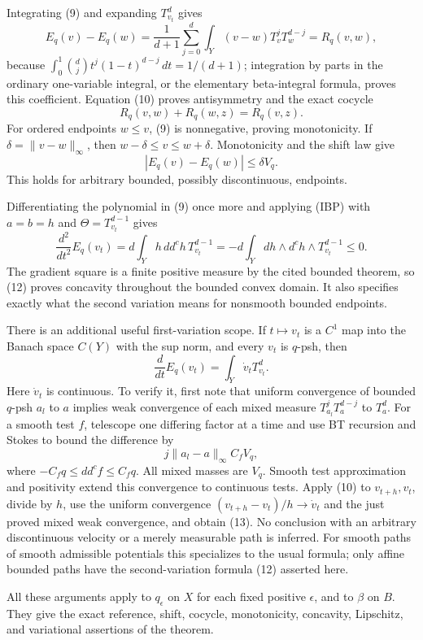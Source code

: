 \documentclass[
  11pt,
]{article}
\begin{document}
Integrating (9) and expanding \(T_{v_t}^d\) gives \[E_q(v)-E_q(w)
=\frac1{d+1}\sum_{j=0}^d\int_Y(v-w)T_v^jT_w^{d-j}
=R_q(v,w), \tag{10}\] because
\(\int_0^1\binom dj t^j(1-t)^{d-j}\,dt=1/(d+1)\); integration by parts
in the ordinary one-variable integral, or the elementary beta-integral
formula, proves this coefficient. Equation (10) proves antisymmetry and
the exact cocycle \[R_q(v,w)+R_q(w,z)=R_q(v,z).\] For ordered endpoints
\(w\leq v\), (9) is nonnegative, proving monotonicity. If
\(\delta=\|v-w\|_\infty\), then \(w-\delta\leq v\leq w+\delta\).
Monotonicity and the shift law give
\[|E_q(v)-E_q(w)|\leq\delta V_q. \tag{11}\] This holds for arbitrary
bounded, possibly discontinuous, endpoints.

Differentiating the polynomial in (9) once more and applying (IBP) with
\(a=b=h\) and \(\Theta=T_{v_t}^{d-1}\) gives \[\frac{d^2}{dt^2}E_q(v_t)
=d\int_Yh\,dd^ch\,T_{v_t}^{d-1}
=-d\int_Ydh\wedge d^ch\wedge T_{v_t}^{d-1}\leq0. \tag{12}\] The gradient
square is a finite positive measure by the cited bounded theorem, so
(12) proves concavity throughout the bounded convex domain. It also
specifies exactly what the second variation means for nonsmooth bounded
endpoints.

There is an additional useful first-variation scope. If \(t\mapsto v_t\)
is a \(C^1\) map into the Banach space \(C(Y)\) with the sup norm, and
every \(v_t\) is \(q\)-psh, then
\[\frac{d}{dt}E_q(v_t)=\int_Y\dot v_t T_{v_t}^d. \tag{13}\] Here
\(\dot v_t\) is continuous. To verify it, first note that uniform
convergence of bounded \(q\)-psh \(a_l\) to \(a\) implies weak
convergence of each mixed measure \(T_{a_l}^jT_a^{d-j}\) to \(T_a^d\).
For a smooth test \(f\), telescope one differing factor at a time and
use BT recursion and Stokes to bound the difference by
\[j\|a_l-a\|_\infty C_f V_q,\] where \(-C_fq\leq dd^cf\leq C_fq\). All
mixed masses are \(V_q\). Smooth test approximation and positivity
extend this convergence to continuous tests. Apply (10) to
\(v_{t+h},v_t\), divide by \(h\), use the uniform convergence
\((v_{t+h}-v_t)/h\to\dot v_t\) and the just proved mixed weak
convergence, and obtain (13). No conclusion with an arbitrary
discontinuous velocity or a merely measurable path is inferred. For
smooth paths of smooth admissible potentials this specializes to the
usual formula; only affine bounded paths have the second-variation
formula (12) asserted here.

All these arguments apply to \(q_\epsilon\) on \(X\) for each fixed
positive \(\epsilon\), and to \(\beta\) on \(B\). They give the exact
reference, shift, cocycle, monotonicity, concavity, Lipschitz, and
variational assertions of the theorem.
\end{document}
